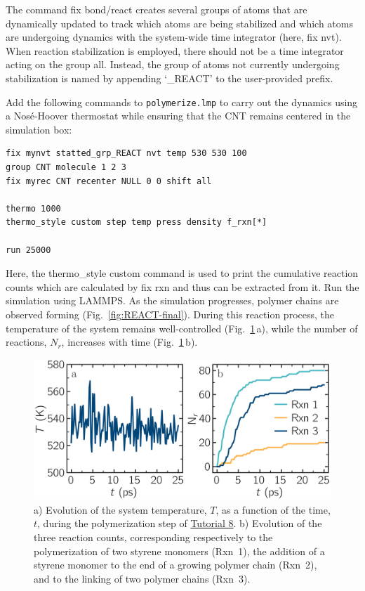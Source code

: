 \documentclass[9pt,tutorial]{livecoms}
\newcommand{\lmpcmd}[1]{\colorbox{listing}{\textcolor{command}{\small{#1}}}} %
\newcommand{\flecmd}[1]{\textcolor{command}{\texttt{#1}}} %
\begin{document}
\begin{note}
  The command \lmpcmd{fix bond/react} creates several groups of atoms that are dynamically updated
  to track which atoms are being stabilized and which atoms are undergoing
  dynamics with the system-wide time integrator (here, \lmpcmd{fix nvt}).
  When reaction stabilization is employed, there should not be a time integrator acting on
  the group \mbox{\lmpcmd{all}.}  Instead, the group of atoms not currently
  undergoing stabilization is named by appending `\_REACT' to the user-provided prefix.
\end{note}

Add the following commands to \flecmd{polymerize.lmp} to
carry out the dynamics using a Nosé-Hoover thermostat
while ensuring that the CNT remains centered in the simulation box:
\begin{lstlisting}
fix mynvt statted_grp_REACT nvt temp 530 530 100
group CNT molecule 1 2 3
fix myrec CNT recenter NULL 0 0 shift all

thermo 1000
thermo_style custom step temp press density f_rxn[*]

run 25000
\end{lstlisting}
Here, the \lmpcmd{thermo_style custom} command is used
to print the cumulative reaction counts which are calculated by \lmpcmd{fix rxn}
and thus can be extracted from it.
Run the simulation using LAMMPS.  As the simulation progresses, polymer chains are
observed forming (Fig.~\ref{fig:REACT-final}).  During this reaction process, the
temperature of the system remains well-controlled (Fig.~\ref{fig:evolution-reacting}\,a),
while the number of reactions, $N_r$, increases with time (Fig.~\ref{fig:evolution-reacting}\,b).

\begin{figure}
\centering
\includegraphics[width=\linewidth]{REACT-reacting}
\caption{a) Evolution of the system temperature, $T$,
as a function of the time, $t$, during the polymerization step of
\hyperref[bond-react-label]{Tutorial 8}.
b) Evolution of the three reaction counts, corresponding respectively to
the polymerization of two styrene monomers (Rxn~1), the  addition of a styrene
monomer to the end of a growing polymer chain (Rxn~2), and to the linking
of two polymer chains (Rxn~3).}
\label{fig:evolution-reacting}
\end{figure}
\end{document}
